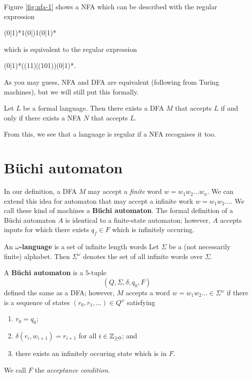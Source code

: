 \begin{example}
    Figure \ref{fig:nfa-1} shows a NFA
    which can be described with the regular expression
    \begin{center}
        \ttfamily
        (0|1)*1(0|\textepsilon)1(0|1)*
    \end{center}
    which is equivalent to the regular expression
    \begin{center}
        \ttfamily
        (0|1)*((11)|(101))(0|1)*.
    \end{center}
\end{example}

As you may guess, NFA and DFA are equivalent 
(following from Turing machines),
but we will still put this formally.

\begin{theorem}
    Let $L$ be a formal language.
    Then there exists a DFA $M$ that accepts $L$
    if and only if there exists a NFA $N$ that accepts $L$.
\end{theorem}

From this, we see that a language is regular if a
NFA recognises it too.

\section{B\"uchi automaton}

In our definition, a DFA $M$
may accept a \emph{finite} word $w = w_1 w_2 \ldots w_n$.
We can extend this idea for automaton that may accept
a infinite work $w = w_1 w_2 \ldots$.
We call these kind of machines a \textbf{B\"uchi automaton}.
The formal definition of a B\"uchi automaton $A$ is identical to a
finite-state automaton; however,
$A$ accepts inputs for which there exists $q_f \in F$ which is
infinitely occuring.

\begin{definition}
    An \textbf{$\omega$-language} is a set of infinite length words
    Let $\Sigma$ be a (not necessarily finite) alphabet.
    Then $\Sigma^\omega$ denotes the set of all infinite words over $\Sigma$.
\end{definition}

\begin{definition}
    A \textbf{B\"uchi automaton}
    is a $5$-tuple
    \[
        (Q, \Sigma, \delta, q_0, F)
    \]
    defined the same as a DFA;
    however, $M$ accepts a word $w = w_1w_2\ldots \in \Sigma^\omega$
    if there is a sequence of states $(r_0, r_1, \ldots) \in Q^\omega$ satisfying
    \begin{enumerate}
        \item $r_0 = q_0$;
        \item $\delta(r_i, w_{i+1}) = r_{i+1}$ for all $i \in \mathbb{Z}_{\geq0}$; and
        \item there exists an infinitely occuring state which is in $F$.
    \end{enumerate}
    We call $F$ the \emph{acceptance condition}.
\end{definition}

